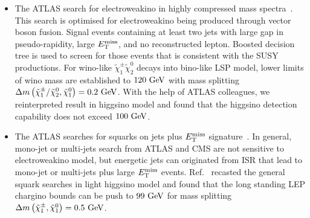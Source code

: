 \documentclass[letterpaper,11pt]{article}
\begin{document}
\begin{itemize}
	\item The ATLAS search for electroweakino in highly compressed mass spectra~\cite{ATLAS:2024woy}. This search is optimised for electroweakino being produced through vector boson fusion. Signal events containing at least two jets with large gap in pseudo-rapidity, large $E_{\rm T}^{\rm miss}$, and no reconstructed lepton. Boosted decision tree is used to screen for those events that is consistent with the SUSY productions. For wino-like $\tilde{\chi}_1^\pm \tilde{\chi}_2^0$ decays into bino-like LSP model, lower limits of wino mass are established to $120~{\rm GeV}$ with mass splitting $\Delta m \left( \tilde{\chi}_1^\pm/ \tilde{\chi}_2^0, \tilde{\chi}_1^0 \right) = 0.2~{\rm GeV}$. With the help of ATLAS colleagues, we reinterpreted result in higgsino model and found that the higgsino detection capability does not exceed $100~{\rm GeV}$.
    
	\item The ATLAS searches for squarks on jets plus $E_{\rm T}^{\rm miss}$ signature~\cite{ATLAS:2020syg, ATLAS:2021kxv}. In general, mono-jet or multi-jets search from ATLAS and CMS are not sensitive to electroweakino model, but energetic jets can originated from ISR that lead to mono-jet or multi-jets plus large $E_{\rm T}^{\rm miss}$ events. Ref.~\cite{Buanes:2022wgm} recasted the general squark searches in light higgsino model and found that the long standing LEP chargino bounds can be push to $99~{\rm GeV}$ for mass splitting $\Delta m \left( \tilde{\chi}_1^\pm, \tilde{\chi}_1^0 \right) = 0.5~{\rm GeV}$.
    

\end{itemize}
\end{document}

